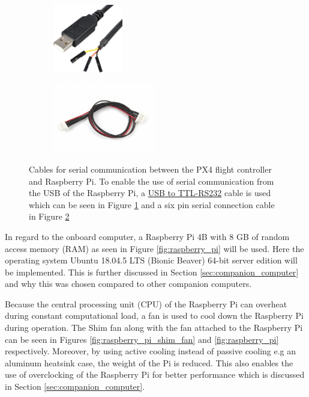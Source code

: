 \documentclass[../Head/report.tex]{subfiles}
\begin{document}
\begin{figure}[H]
    \centering
    \hspace{-4.0em}
    \begin{subfigure}[b]{.3\textwidth}
        \centering
        \includegraphics[height=3cm]{../Figures/raspberry_pi/usb-TTL_232R_Raspberry_Pi_debug.png}
        \caption{}
        \label{fig:usb-TTL_232R_Raspberry_Pi_debug}
    \end{subfigure}
    \begin{subfigure}[b]{.25\textwidth}
        \centering
        \includegraphics[height=3cm]{../Figures/raspberry_pi/holybro-pixhawk-4-mini-uart-cable.jpg}
        \caption{}
        \label{fig:six_pin_serial_connection_cable}
    \end{subfigure}
    \caption{Cables for serial communication between the PX4 flight controller and Raspberry Pi. To enable the use of serial communication from the USB of the Raspberry Pi, a \href{https://raspberrypi.dk/en/product/usb-to-ttl-rs232-debug-cable-for-raspberry-pi/}{USB to TTL-RS232} cable is used which can be seen in Figure \ref{fig:usb-TTL_232R_Raspberry_Pi_debug} and a six pin serial connection cable in Figure \ref{fig:six_pin_serial_connection_cable}}
    \label{fig:pixhawk_mini_four}
\end{figure}

In regard to the onboard computer, a Raspberry Pi 4B with 8 GB of random access memory (RAM) as seen in Figure \ref{fig:raspberry_pi} will be used. Here the operating system Ubuntu 18.04.5 LTS (Bionic Beaver) 64-bit server edition will be implemented. This is further discussed in Section \ref{sec:companion_computer} and why this was chosen compared to other companion computers. 

Because the central processing unit (CPU) of the Raspberry Pi can overheat during constant computational load, a fan is used to cool down the Raspberry Pi during operation. The Shim fan along with the fan attached to the Raspberry Pi can be seen in Figures \ref{fig:raspberry_pi_shim_fan} and \ref{fig:raspberry_pi} respectively. Moreover, by using active cooling instead of passive cooling e.g an aluminum heatsink case, the weight of the Pi is reduced. This also enables the use of overclocking of the Raspberry Pi for better performance which is discussed in Section \ref{sec:companion_computer}.
\end{document}
